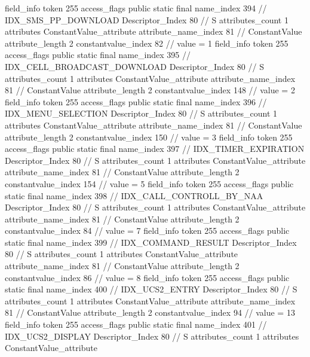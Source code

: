 {{{{{{{				}
				}
			}
			field_info {
				token	255
				access_flags	public static final
				name_index	394		// IDX_SMS_PP_DOWNLOAD
				Descriptor_Index	80		// S
				attributes_count	1
				attributes {
				ConstantValue_attribute {
					attribute_name_index	81		// ConstantValue
					attribute_length	2
					constantvalue_index	82		// value = 1
				}
				}
			}
			field_info {
				token	255
				access_flags	public static final
				name_index	395		// IDX_CELL_BROADCAST_DOWNLOAD
				Descriptor_Index	80		// S
				attributes_count	1
				attributes {
				ConstantValue_attribute {
					attribute_name_index	81		// ConstantValue
					attribute_length	2
					constantvalue_index	148		// value = 2
				}
				}
			}
			field_info {
				token	255
				access_flags	public static final
				name_index	396		// IDX_MENU_SELECTION
				Descriptor_Index	80		// S
				attributes_count	1
				attributes {
				ConstantValue_attribute {
					attribute_name_index	81		// ConstantValue
					attribute_length	2
					constantvalue_index	150		// value = 3
				}
				}
			}
			field_info {
				token	255
				access_flags	public static final
				name_index	397		// IDX_TIMER_EXPIRATION
				Descriptor_Index	80		// S
				attributes_count	1
				attributes {
				ConstantValue_attribute {
					attribute_name_index	81		// ConstantValue
					attribute_length	2
					constantvalue_index	154		// value = 5
				}
				}
			}
			field_info {
				token	255
				access_flags	public static final
				name_index	398		// IDX_CALL_CONTROLL_BY_NAA
				Descriptor_Index	80		// S
				attributes_count	1
				attributes {
				ConstantValue_attribute {
					attribute_name_index	81		// ConstantValue
					attribute_length	2
					constantvalue_index	84		// value = 7
				}
				}
			}
			field_info {
				token	255
				access_flags	public static final
				name_index	399		// IDX_COMMAND_RESULT
				Descriptor_Index	80		// S
				attributes_count	1
				attributes {
				ConstantValue_attribute {
					attribute_name_index	81		// ConstantValue
					attribute_length	2
					constantvalue_index	86		// value = 8
				}
				}
			}
			field_info {
				token	255
				access_flags	public static final
				name_index	400		// IDX_UCS2_ENTRY
				Descriptor_Index	80		// S
				attributes_count	1
				attributes {
				ConstantValue_attribute {
					attribute_name_index	81		// ConstantValue
					attribute_length	2
					constantvalue_index	94		// value = 13
				}
				}
			}
			field_info {
				token	255
				access_flags	public static final
				name_index	401		// IDX_UCS2_DISPLAY
				Descriptor_Index	80		// S
				attributes_count	1
				attributes {
				ConstantValue_attribute {
}}}}}}}
